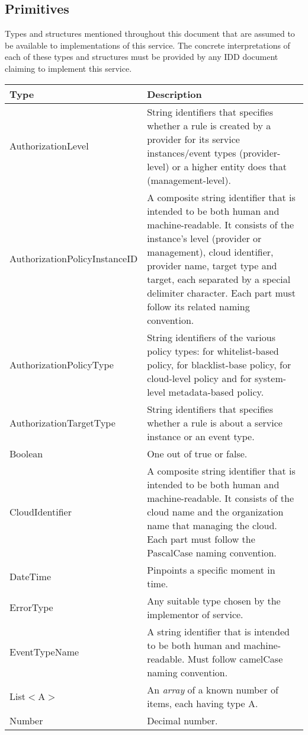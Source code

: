 \documentclass[a4paper]{arrowhead}
\newcommand{\pdef}[1]{{\textcolor{ArrowheadGrey}{#1\label{sec:model:primitives:#1}\label{sec:model:primitives:#1s}\label{sec:model:primitives:#1es}}}}
\begin{document}
\subsection{Primitives}
\label{sec:model:primitives}

Types and structures mentioned throughout this document that are assumed to be available to implementations of this service.
The concrete interpretations of each of these types and structures must be provided by any IDD document claiming to implement this service.


\begin{table}[ht!]
\begin{tabularx}{\textwidth}{| p{5cm} | X |} \hline
\rowcolor{gray!33} Type & Description \\ \hline
\pdef{AuthorizationLevel} & String identifiers that specifies whether a rule is created by a provider for its service instances/event types (provider-level) or a higher entity does that (management-level). \\ \hline
\pdef{AuthorizationPolicyInstanceID} & A composite string identifier that is intended to be both human and machine-readable. It consists of the instance's level (provider or management), cloud identifier, provider name, target type and target, each separated by a special delimiter character. Each part must follow its related naming convention. \\ \hline
\pdef{AuthorizationPolicyType} & String identifiers of the various policy types: for whitelist-based policy, for blacklist-base policy, for cloud-level policy and for system-level metadata-based policy. \\ \hline
\pdef{AuthorizationTargetType} & String identifiers that specifies whether a rule is about a service instance or an event type. \\ \hline
\pdef{Boolean}          & One out of true or false. \\ \hline
\pdef{CloudIdentifier} & A composite string identifier that is intended to be both human and machine-readable. It consists of the cloud name and the organization name that managing the cloud. Each part must follow the PascalCase naming convention. \\ \hline
\pdef{DateTime}         & Pinpoints a specific moment in time. \\ \hline
\pdef{ErrorType}        & Any suitable type chosen by the implementor of service. \\ \hline
\pdef{EventTypeName}      & A string identifier that is intended to be both human and machine-readable. Must follow camelCase naming convention. \\ \hline
\pdef{List}$<$A$>$      & An \textit{array} of a known number of items, each having type A. \\ \hline
\pdef{Number}           & Decimal number. \\ \hline
\end{tabularx}
\end{table}
\end{document}
